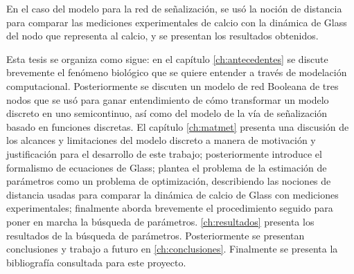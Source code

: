 En el caso del modelo para la red de señalización, se usó la noción de distancia para comparar las mediciones experimentales de calcio con la dinámica de Glass del nodo que representa al calcio, y se presentan los resultados obtenidos.

Esta tesis se organiza como sigue: en el capítulo \ref{ch:antecedentes} se discute brevemente el fenómeno biológico que se quiere entender a través de modelación computacional. Posteriormente se discuten un modelo de red Booleana de tres nodos que se usó para ganar entendimiento de cómo transformar un modelo discreto en uno semicontinuo, así como del modelo de la vía de señalización basado en funciones discretas. El capítulo \ref{ch:matmet} presenta una discusión de los alcances y limitaciones del modelo discreto a manera de motivación y justificación para el desarrollo de este trabajo; posteriormente introduce el formalismo de ecuaciones de Glass; plantea el problema de la estimación de parámetros como un problema de optimización, describiendo las nociones de distancia usadas para comparar la dinámica de calcio de Glass con mediciones experimentales; finalmente aborda brevemente el procedimiento seguido para poner en marcha la búsqueda de parámetros.
\ref{ch:resultados} presenta los resultados de la búsqueda de parámetros. Posteriormente se presentan conclusiones y trabajo a futuro en \ref{ch:conclusiones}. Finalmente se presenta la bibliografía consultada para este proyecto.

\endgroup			

\vfill
